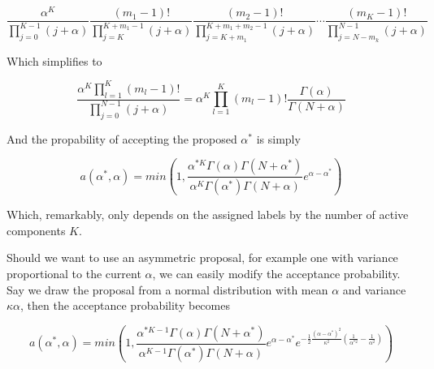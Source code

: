 \documentclass[11pt]{article}
\begin{document}
\begin{equation}
\frac{\alpha^K}{\prod_{j=0}^{K-1} (j + \alpha)} \frac{(m_1-1)!}{\prod_{j=K}^{K+m_1-1}(j + \alpha)} \frac{(m_2-1)!}{\prod_{j=K+m_1}^{K+m_1+m_2-1}(j + \alpha)} \cdots \frac{(m_K-1)!}{\prod_{j=N-m_k}^{N-1}(j + \alpha)}
\end{equation}

Which simplifies to

\begin{equation}
\frac{\alpha^K \prod_{l=1}^{K} (m_l - 1)!}{\prod_{j=0}^{N-1}(j+\alpha)} = 
\alpha^K\prod_{l=1}^{K} (m_l-1)! \frac{\Gamma(\alpha)}{\Gamma(N+\alpha)}
\end{equation}

And the propability of accepting the proposed $\alpha^*$ is simply

\begin{equation}
a(\alpha^*,\alpha) = min\left(1,\frac{\alpha^{*K}\Gamma(\alpha)\Gamma(N+\alpha^*)}{\alpha^{K}\Gamma(\alpha^*)\Gamma(N+\alpha)}  e^{\alpha-\alpha^*}\right)
\end{equation}

Which, remarkably, only depends on the assigned labels by the number of active components $K$.

Should we want to use an asymmetric proposal, for example one with variance proportional to the current $\alpha$, we can easily modify the acceptance probability.  Say we draw the proposal from a normal distribution with mean $\alpha$ and variance $\kappa \alpha$, then the acceptance probability becomes

\begin{equation}
a(\alpha^*,\alpha) = min\left(1,\frac{\alpha^{*K-1}\Gamma(\alpha)\Gamma(N+\alpha^*)}{\alpha^{K-1}\Gamma(\alpha^*)\Gamma(N+\alpha)}  e^{\alpha-\alpha^*} e^{-\frac{1}{2}\frac{(\alpha-\alpha^*)^2}{\kappa^2} \left(\frac{1}{\alpha^{*2}} - \frac{1}{\alpha^2} \right)} \right)
\end{equation}
\end{document}
